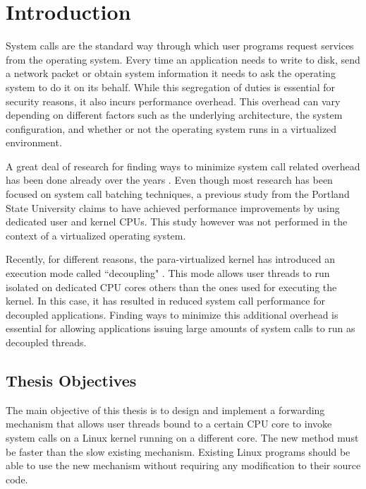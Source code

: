 \chapter{Introduction}

System calls are the standard way through which user programs request services
from the operating system. Every time an application needs to write to disk,
send a network packet or obtain system information it needs to ask the
operating system to do it on its behalf. While this segregation of duties is
essential for security reasons, it also incurs performance overhead. This
overhead can vary depending on different factors such as the underlying
architecture, the system configuration, and whether or not the operating system
runs in a virtualized environment.

A great deal of research for finding ways to minimize system call related
overhead has been done already over the years
\cite{clustering}\cite{compositecalls}\cite{cassyopia}\cite{compositecalls2}.
Even though most research has been focused on system call batching techniques,
a previous study \cite{dedicated_cpus} from the Portland State University
claims to have achieved performance improvements by using dedicated user and
kernel CPUs. This study however was not performed in the context of a
virtualized operating system.

Recently, for different reasons, the para-virtualized \llinux kernel has
introduced an execution mode called ``decoupling" \cite{decoupling}. This mode
allows user threads to run isolated on dedicated CPU cores others than the ones
used for executing the \llinux kernel. In this case, it has resulted in reduced
system call performance for decoupled applications. Finding ways to minimize
this additional overhead is essential for allowing applications issuing large
amounts of system calls to run as decoupled threads.

\section{Thesis Objectives}

The main objective of this thesis is to design and implement a forwarding
mechanism that allows user threads bound to a certain CPU core to invoke system
calls on a Linux kernel running on a different core. The new method must be
faster than the slow existing mechanism. Existing Linux programs should be able
to use the new mechanism without requiring any modification to their source
code.

